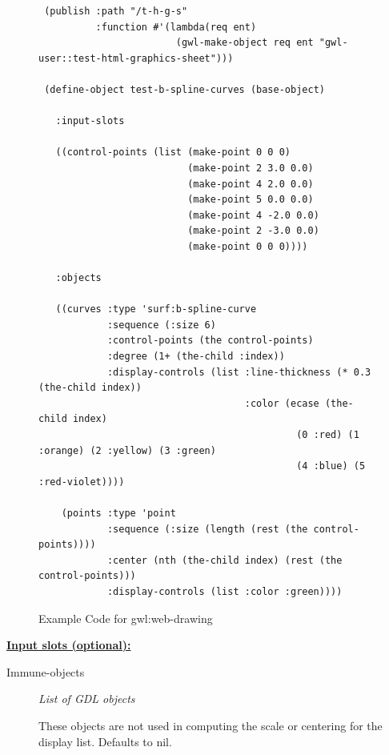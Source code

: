 \documentclass [11pt]{book}
\begin{document}
\begin{itemize}
\begin{figure}
\begin{lrbox}{\boxedverb}
\begin{minipage}{\linewidth}
{\begin{verbatim}
 (publish :path "/t-h-g-s"
          :function #'(lambda(req ent)
                        (gwl-make-object req ent "gwl-user::test-html-graphics-sheet")))

 (define-object test-b-spline-curves (base-object)

   :input-slots

   ((control-points (list (make-point 0 0 0)
                          (make-point 2 3.0 0.0) 
                          (make-point 4 2.0 0.0) 
                          (make-point 5 0.0 0.0) 
                          (make-point 4 -2.0 0.0) 
                          (make-point 2 -3.0 0.0) 
                          (make-point 0 0 0))))
  
   :objects

   ((curves :type 'surf:b-spline-curve
            :sequence (:size 6)
            :control-points (the control-points)
            :degree (1+ (the-child :index))
            :display-controls (list :line-thickness (* 0.3 (the-child index))
                                    :color (ecase (the-child index)
                                             (0 :red) (1 :orange) (2 :yellow) (3 :green)
                                             (4 :blue) (5 :red-violet))))

    (points :type 'point 
            :sequence (:size (length (rest (the control-points))))
            :center (nth (the-child index) (rest (the control-points)))
            :display-controls (list :color :green))))

\end{verbatim}}
\end{minipage}
\end{lrbox}
\fbox{\usebox{\boxedverb}}

\caption{Example Code for gwl:web-drawing}

\label{fig:example-code-gwl:web-drawing}

\end{figure}





\textbf{
\underline{Input slots (optional):}}

\begin{description}

\item [Immune-objects]
\emph{List of GDL objects}

 These objects are not used in computing the scale or centering for the display list. Defaults to nil.





\end{description}
\end{itemize}
\end{document}
